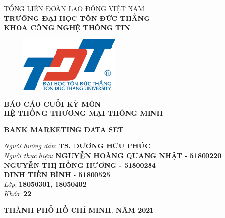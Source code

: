 \documentclass{report}
\begin{document}
\begin{center}
	\fontsize{14}{20}\selectfont
	\textsc{TỔNG LIÊN ĐOÀN LAO ĐỘNG VIỆT NAM\\ 
		\textbf{TRƯỜNG ĐẠI HỌC TÔN ĐỨC THẮNG\\} 
		\textbf{KHOA CÔNG NGHỆ THÔNG TIN}}
	
	\vspace{0.08cm}
	\begin{figure}[htp]
		\begin{center}
			\includegraphics[width=5cm]{images/TĐT_logo.png}
		\end{center}
	\end{figure}
	
	\fontsize{15}{20}\selectfont\textbf{BÁO CÁO CUỐI KỲ MÔN\\HỆ THỐNG THƯƠNG MẠI THÔNG MINH\\}
	
	\vspace{2cm}
	\fontsize{24}{20}\selectfont\textbf{BANK MARKETING DATA SET}
\end{center}
\vspace{1.5cm}

\begin{flushright}
	\fontsize{14}{20}\selectfont
	\textit{Người hướng dẫn}: \textbf{TS. DƯƠNG HỮU PHÚC}\\
	\textit{Người thực hiện}:
	\textbf{NGUYỄN HOÀNG QUANG NHẬT - 51800220}\\
	\textbf{NGUYỄN THỊ HỒNG HƯƠNG - 51800284}\\
	\textbf{ĐINH TIẾN BÌNH - 51800525}\\
	\textit{Lớp}: \textbf{18050301, 18050402}\\
	\textit{Khóa}: \textbf{22}\\
\end{flushright}
\vspace{2cm}
\begin{center}
	\fontsize{14}{20}\selectfont
	\textbf{THÀNH PHỐ HỒ CHÍ MINH, NĂM 2021}
\end{center}
\pagebreak

\end{document}
